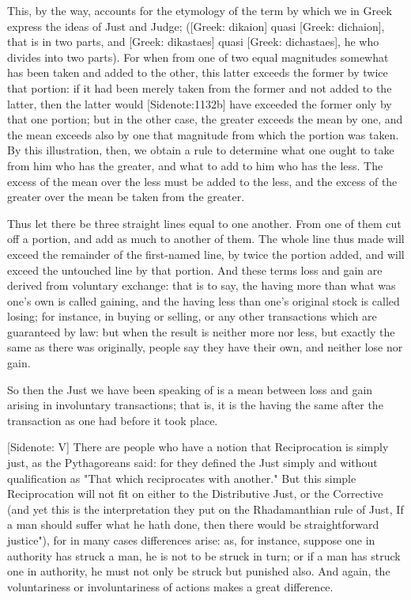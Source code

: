 This, by the way, accounts for the etymology of the term by which we
in Greek express the ideas of Just and Judge; ([Greek: dikaion] quasi
[Greek: dichaion], that is in two parts, and [Greek: dikastaes] quasi
[Greek: dichastaes], he who divides into two parts). For when from one
of two equal magnitudes somewhat has been taken and added to the other,
this latter exceeds the former by twice that portion: if it had been
merely taken from the former and not added to the latter, then the
latter would [Sidenote:1132b] have exceeded the former only by that one
portion; but in the other case, the greater exceeds the mean by one, and
the mean exceeds also by one that magnitude from which the portion was
taken. By this illustration, then, we obtain a rule to determine what
one ought to take from him who has the greater, and what to add to him
who has the less. The excess of the mean over the less must be added to
the less, and the excess of the greater over the mean be taken from the
greater.

Thus let there be three straight lines equal to one another. From one of
them cut off a portion, and add as much to another of them. The whole
line thus made will exceed the remainder of the first-named line, by
twice the portion added, and will exceed the untouched line by that
portion. And these terms loss and gain are derived from voluntary
exchange: that is to say, the having more than what was one's own is
called gaining, and the having less than one's original stock is called
losing; for instance, in buying or selling, or any other transactions
which are guaranteed by law: but when the result is neither more nor
less, but exactly the same as there was originally, people say they have
their own, and neither lose nor gain.

So then the Just we have been speaking of is a mean between loss and
gain arising in involuntary transactions; that is, it is the having the
same after the transaction as one had before it took place.

[Sidenote: V] There are people who have a notion that Reciprocation is
simply just, as the Pythagoreans said: for they defined the Just simply
and without qualification as "That which reciprocates with another." But
this simple Reciprocation will not fit on either to the Distributive
Just, or the Corrective (and yet this is the interpretation they put
on the Rhadamanthian rule of Just, If a man should suffer what he hath
done, then there would be straightforward justice"), for in many
cases differences arise: as, for instance, suppose one in authority
has struck a man, he is not to be struck in turn; or if a man has
struck one in authority, he must not only be struck but punished also.
And again, the voluntariness or involuntariness of actions makes a
great difference.


